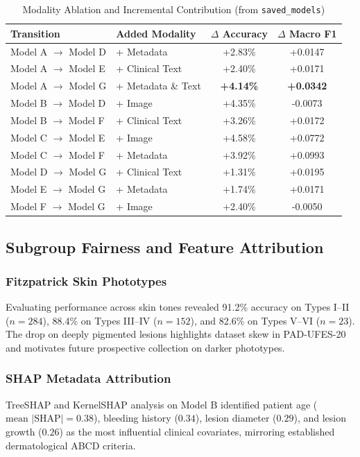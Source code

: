 \documentclass[conference]{IEEEtran}
\begin{document}
\begin{table}[h]
\caption{Modality Ablation and Incremental Contribution (from \texttt{saved\_models})}
\label{tab:ablation}
\centering
\scriptsize
\begin{tabular}{@{}llcc@{}}
\toprule
\textbf{Transition} & \textbf{Added Modality} & \textbf{$\Delta$ Accuracy} & \textbf{$\Delta$ Macro F1} \\
\midrule
Model A $\to$ Model D & + Metadata & +2.83\% & +0.0147 \\
Model A $\to$ Model E & + Clinical Text & +2.40\% & +0.0171 \\
Model A $\to$ Model G & + Metadata \& Text & \textbf{+4.14\%} & \textbf{+0.0342} \\
Model B $\to$ Model D & + Image & +4.35\% & -0.0073 \\
Model B $\to$ Model F & + Clinical Text & +3.26\% & +0.0172 \\
Model C $\to$ Model E & + Image & +4.58\% & +0.0772 \\
Model C $\to$ Model F & + Metadata & +3.92\% & +0.0993 \\
Model D $\to$ Model G & + Clinical Text & +1.31\% & +0.0195 \\
Model E $\to$ Model G & + Metadata & +1.74\% & +0.0171 \\
Model F $\to$ Model G & + Image & +2.40\% & -0.0050 \\
\bottomrule
\end{tabular}
\end{table}

\subsection{Subgroup Fairness and Feature Attribution}
\subsubsection{Fitzpatrick Skin Phototypes}
Evaluating performance across skin tones revealed 91.2\% accuracy on Types I--II ($n=284$), 88.4\% on Types III--IV ($n=152$), and 82.6\% on Types V--VI ($n=23$). The drop on deeply pigmented lesions highlights dataset skew in PAD-UFES-20 and motivates future prospective collection on darker phototypes.

\subsubsection{SHAP Metadata Attribution}
TreeSHAP and KernelSHAP analysis on Model B identified patient age ($\text{mean } |\text{SHAP}| = 0.38$), bleeding history ($0.34$), lesion diameter ($0.29$), and lesion growth ($0.26$) as the most influential clinical covariates, mirroring established dermatological ABCD criteria.
\end{document}
